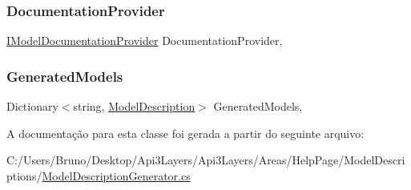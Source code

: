 \subsubsection{\texorpdfstring{Documentation\+Provider}{DocumentationProvider}}
{\footnotesize\ttfamily \hyperlink{interfaceApi3Layers_1_1Areas_1_1HelpPage_1_1ModelDescriptions_1_1IModelDocumentationProvider}{I\+Model\+Documentation\+Provider} Documentation\+Provider\hspace{0.3cm}{\ttfamily [get]}, {\ttfamily [private]}}

\mbox{\label{classApi3Layers_1_1Areas_1_1HelpPage_1_1ModelDescriptions_1_1ModelDescriptionGenerator_a3132a32205bd0f5029c2a01ab8c29e64}} 
\subsubsection{\texorpdfstring{Generated\+Models}{GeneratedModels}}
{\footnotesize\ttfamily Dictionary$<$string, \hyperlink{classApi3Layers_1_1Areas_1_1HelpPage_1_1ModelDescriptions_1_1ModelDescription}{Model\+Description}$>$ Generated\+Models\hspace{0.3cm}{\ttfamily [get]}, {}}



A documentação para esta classe foi gerada a partir do seguinte arquivo\+:\begin{DoxyCompactItemize}
\item 
C\+:/\+Users/\+Bruno/\+Desktop/\+Api3\+Layers/\+Api3\+Layers/\+Areas/\+Help\+Page/\+Model\+Descriptions/\hyperlink{ModelDescriptionGenerator_8cs}{Model\+Description\+Generator.\+cs}\end{DoxyCompactItemize}

